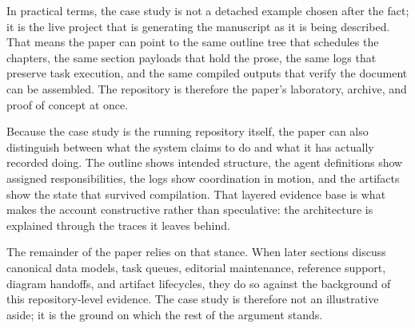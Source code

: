 \documentclass[11pt]{article}
\begin{document}
In practical terms, the case study is not a detached example chosen after the fact; it is the live project that is generating the manuscript as it is being described. That means the paper can point to the same outline tree that schedules the chapters, the same section payloads that hold the prose, the same logs that preserve task execution, and the same compiled outputs that verify the document can be assembled. The repository is therefore the paper's laboratory, archive, and proof of concept at once.

Because the case study is the running repository itself, the paper can also distinguish between what the system claims to do and what it has actually recorded doing. The outline shows intended structure, the agent definitions show assigned responsibilities, the logs show coordination in motion, and the artifacts show the state that survived compilation. That layered evidence base is what makes the account constructive rather than speculative: the architecture is explained through the traces it leaves behind.

The remainder of the paper relies on that stance. When later sections discuss canonical data models, task queues, editorial maintenance, reference support, diagram handoffs, and artifact lifecycles, they do so against the background of this repository-level evidence. The case study is therefore not an illustrative aside; it is the ground on which the rest of the argument stands.
\end{document}
